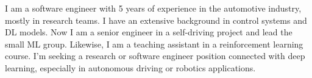I am a software engineer with 5 years of experience in the automotive industry,
mostly in research teams. I have an extensive background in control
systems and DL models. Now I am a senior engineer in a self-driving project and lead the small ML group. Likewise, I am a teaching assistant
in a reinforcement learning course. I'm seeking a research or software engineer
position connected with deep learning, especially in autonomous driving or
robotics applications.